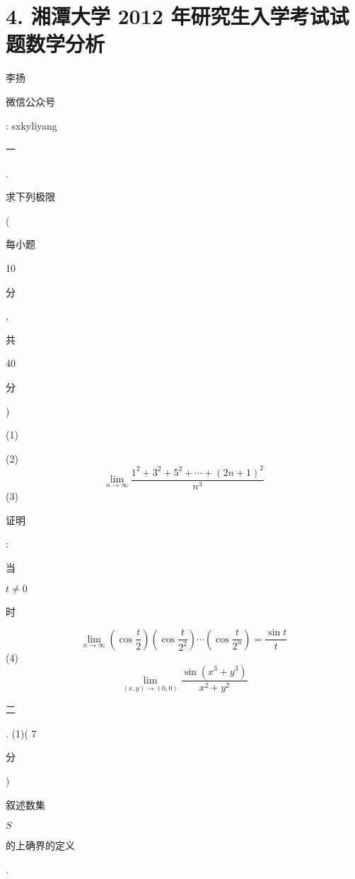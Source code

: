 \documentclass[10pt]{article}
\begin{document}
\section{4. 湘潭大学 2012 年研究生入学考试试题数学分析}
\begin{CJK}{UTF8}{mj}李扬\end{CJK}

\begin{CJK}{UTF8}{mj}微信公众号\end{CJK}: sxkyliyang

\begin{CJK}{UTF8}{mj}一\end{CJK}. \begin{CJK}{UTF8}{mj}求下列极限\end{CJK} (\begin{CJK}{UTF8}{mj}每小题\end{CJK} 10 \begin{CJK}{UTF8}{mj}分\end{CJK}, \begin{CJK}{UTF8}{mj}共\end{CJK} 40 \begin{CJK}{UTF8}{mj}分\end{CJK})

(1)

(2)
$$
\lim _{n \rightarrow \infty} \frac{1^{2}+3^{2}+5^{2}+\cdots+(2 n+1)^{2}}{n^{3}}
$$
(3) \begin{CJK}{UTF8}{mj}证明\end{CJK}: \begin{CJK}{UTF8}{mj}当\end{CJK} $t \neq 0$ \begin{CJK}{UTF8}{mj}时\end{CJK}
$$
\lim _{n \rightarrow \infty}\left(\cos \frac{t}{2}\right)\left(\cos \frac{t}{2^{2}}\right) \cdots\left(\cos \frac{t}{2^{n}}\right)=\frac{\sin t}{t}
$$
(4)
$$
\lim _{(x, y) \rightarrow(0,0)} \frac{\sin \left(x^{3}+y^{3}\right)}{x^{2}+y^{2}}
$$
\begin{CJK}{UTF8}{mj}二\end{CJK}. (1)( 7 \begin{CJK}{UTF8}{mj}分\end{CJK}) \begin{CJK}{UTF8}{mj}叙述数集\end{CJK} $S$ \begin{CJK}{UTF8}{mj}的上确界的定义\end{CJK}.
\end{document}
